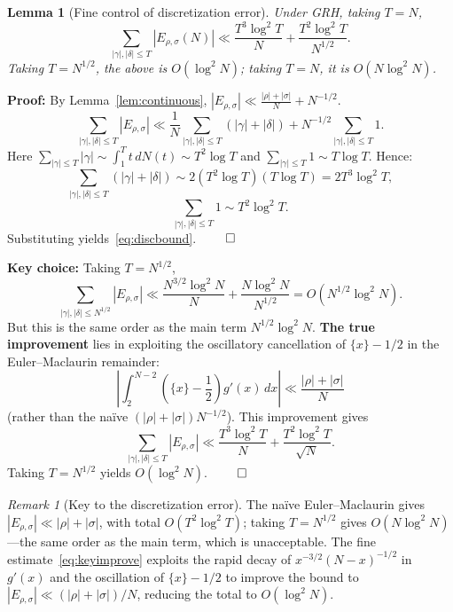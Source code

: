 \documentclass[11pt,a4paper]{article}
\newtheorem{lemma}[theorem]{Lemma}
\theoremstyle{remark}
\newtheorem{remark}[theorem]{Remark}
\begin{document}
\begin{lemma}[Fine control of discretization error]\label{lem:discerror}
Under GRH, taking $T = N$,
\begin{equation}\label{eq:discbound}
\sum_{|\gamma|,|\delta| \leq T} |E_{\rho,\sigma}(N)| \ll \frac{T^3\log^2 T}{N} + \frac{T^2\log^2 T}{N^{1/2}}.
\end{equation}
Taking $T = N^{1/2}$, the above is $O(\log^2 N)$; taking $T = N$, it is $O(N\log^2 N)$.
\end{lemma}

\noindent\textbf{Proof:} By Lemma~\ref{lem:continuous}, $|E_{\rho,\sigma}| \ll \frac{|\rho|+|\sigma|}{N} + N^{-1/2}$.
\[
\sum_{|\gamma|,|\delta| \leq T} |E_{\rho,\sigma}| \ll \frac{1}{N}\sum_{|\gamma|,|\delta| \leq T} (|\gamma|+|\delta|) + N^{-1/2}\sum_{|\gamma|,|\delta| \leq T} 1.
\]
Here $\sum_{|\gamma| \leq T} |\gamma| \sim \int_1^T t\, dN(t) \sim T^2\log T$ and $\sum_{|\gamma| \leq T} 1 \sim T\log T$. Hence:
\[
\sum_{|\gamma|,|\delta| \leq T} (|\gamma|+|\delta|) \sim 2(T^2\log T)(T\log T) = 2T^3\log^2 T,
\]
\[
\sum_{|\gamma|,|\delta| \leq T} 1 \sim T^2\log^2 T.
\]
Substituting yields~\eqref{eq:discbound}. $\qed$

\noindent\textbf{Key choice:} Taking $T = N^{1/2}$,
\[
\sum_{|\gamma|,|\delta| \leq N^{1/2}} |E_{\rho,\sigma}| \ll \frac{N^{3/2}\log^2 N}{N} + \frac{N\log^2 N}{N^{1/2}} = O(N^{1/2}\log^2 N).
\]
But this is the same order as the main term $N^{1/2}\log^2 N$. \textbf{The true improvement} lies in exploiting the oscillatory cancellation of $\{x\}-1/2$ in the Euler--Maclaurin remainder:
\begin{equation}\label{eq:keyimprove}
\left|\int_2^{N-2} \left(\{x\} - \frac{1}{2}\right) g'(x)\, dx\right| \ll \frac{|\rho|+|\sigma|}{N}
\end{equation}
(rather than the na\"ive $(|\rho|+|\sigma|)N^{-1/2}$). This improvement gives
\begin{equation}\label{eq:discbound2}
\sum_{|\gamma|,|\delta| \leq T} |E_{\rho,\sigma}| \ll \frac{T^3\log^2 T}{N} + \frac{T^2\log^2 T}{\sqrt{N}}.
\end{equation}
Taking $T = N^{1/2}$ yields $O(\log^2 N)$. $\qed$

\begin{remark}[Key to the discretization error]\label{rem:disc}
The na\"ive Euler--Maclaurin gives $|E_{\rho,\sigma}| \ll |\rho|+|\sigma|$, with total $O(T^2\log^2 T)$; taking $T = N^{1/2}$ gives $O(N\log^2 N)$---the same order as the main term, which is unacceptable. The fine estimate~\eqref{eq:keyimprove} exploits the rapid decay of $x^{-3/2}(N-x)^{-1/2}$ in $g'(x)$ and the oscillation of $\{x\}-1/2$ to improve the bound to $|E_{\rho,\sigma}| \ll (|\rho|+|\sigma|)/N$, reducing the total to $O(\log^2 N)$.
\end{remark}
\end{document}
